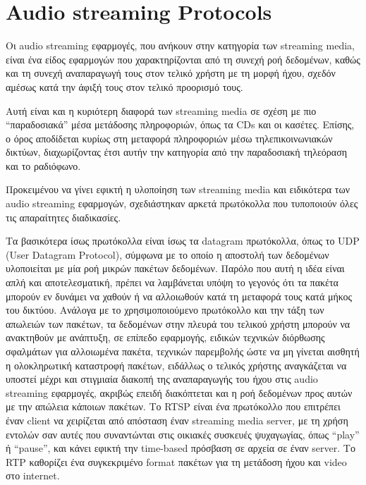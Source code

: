 \documentclass{article}
\begin{document}
\section*{Audio streaming Protocols}
Οι audio streaming εφαρμογές, που ανήκουν στην κατηγορία των streaming media, είναι ένα είδος εφαρμογών που χαρακτηρίζονται από τη συνεχή ροή δεδομένων, καθώς και τη συνεχή αναπαραγωγή τους στον τελικό χρήστη με τη μορφή ήχου, σχεδόν αμέσως κατά την άφιξή τους στον τελικό προορισμό τους.

Αυτή είναι και η κυριότερη διαφορά των streaming media σε σχέση με πιο “παραδοσιακά” μέσα μετάδοσης πληροφοριών, όπως τα CDs και οι κασέτες.
Επίσης, ο όρος αποδίδεται κυρίως στη μεταφορά πληροφοριών μέσω τηλεπικοινωνιακών δικτύων, διαχωρίζοντας έτσι αυτήν την κατηγορία από την παραδοσιακή τηλεόραση και το ραδιόφωνο.

Προκειμένου να γίνει εφικτή η υλοποίηση των streaming media και ειδικότερα των audio streaming εφαρμογών, σχεδιάστηκαν αρκετά πρωτόκολλα που τυποποιούν όλες τις απαραίτητες διαδικασίες.

Τα βασικότερα ίσως πρωτόκολλα είναι ίσως τα datagram πρωτόκολλα, όπως το UDP (User Datagram Protocol), σύμφωνα με το οποίο η αποστολή των δεδομένων υλοποιείται με μία ροή μικρών πακέτων δεδομένων.
Παρόλο που αυτή η ιδέα είναι απλή και αποτελεσματική, πρέπει να λαμβάνεται υπόψη το γεγονός ότι τα πακέτα μπορούν εν δυνάμει να χαθούν ή να αλλοιωθούν κατά τη μεταφορά τους κατά μήκος του δικτύου.
Ανάλογα με το χρησιμοποιούμενο πρωτόκολλο και την τάξη των απωλειών των πακέτων, τα δεδομένων στην πλευρά του τελικού χρήστη μπορούν να ανακτηθούν με ανάπτυξη, σε επίπεδο εφαρμογής, ειδικών τεχνικών διόρθωσης σφαλμάτων για αλλοιωμένα πακέτα, τεχνικών παρεμβολής ώστε να μη γίνεται αισθητή η ολοκληρωτική καταστροφή πακέτων, ειδάλλως ο τελικός χρήστης αναγκάζεται να υποστεί μέχρι και στιγμιαία διακοπή της αναπαραγωγής του ήχου στις audio streaming εφαρμογές, ακριβώς επειδή διακόπτεται και η ροή δεδομένων προς αυτών με την απώλεια κάποιων πακέτων.
Το RTSP είναι ένα πρωτόκολλο που επιτρέπει έναν client να χειρίζεται από απόσταση έναν streaming media server, με τη χρήση εντολών σαν αυτές που συναντώνται στις οικιακές συσκευές ψυχαγωγίας, όπως “play” ή “pause”, και κάνει εφικτή την time-based πρόσβαση σε αρχεία σε έναν server.
Το RTP καθορίζει ένα συγκεκριμένο format πακέτων για τη μετάδοση ήχου και video στο internet.
\end{document}
